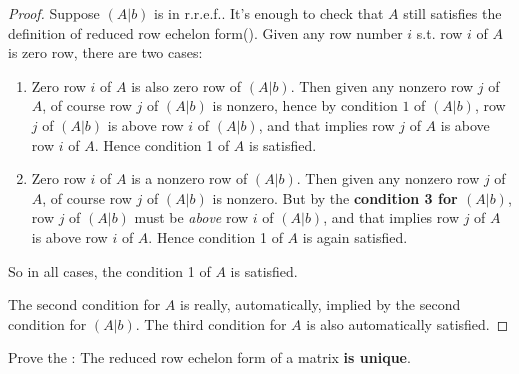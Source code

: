 \begin{proof}
Suppose \((A|b)\) is in r.r.e.f..
It's enough to check that \(A\) still satisfies the definition of reduced row echelon form().
Given any row number \(i\) s.t. row \(i\) of \(A\) is zero row, there are two cases:
\begin{enumerate}
\item Zero row \(i\) of \(A\) is also zero row of \((A|b)\).
    Then given any nonzero row \(j\) of \(A\), of course row \(j\) of \((A|b)\) is nonzero, hence by condition \(1\) of \((A|b)\),
    row \(j\) of \((A|b)\) is above row \(i\) of \((A|b)\), and that implies row \(j\) of \(A\) is above row \(i\) of \(A\).
    Hence condition 1 of \(A\) is satisfied.
\item Zero row \(i\) of \(A\) is a nonzero row of \((A|b)\).
    Then given any nonzero row \(j\) of \(A\), of course row \(j\) of \((A|b)\) is nonzero.
    But by the \textbf{condition 3 for \((A|b)\)}, row \(j\) of \((A|b)\) must be \emph{above} row \(i\) of \((A|b)\), and that implies row \(j\) of \(A\) is above row \(i\) of \(A\).
    Hence condition 1 of \(A\) is again satisfied.
\end{enumerate}
So in all cases, the condition 1 of \(A\) is satisfied.

The second condition for \(A\) is really, automatically, implied by the second condition for \((A|b)\).
The third condition for \(A\) is also automatically satisfied.
\end{proof}

\begin{exercise} \label{exercise 3.4.15}
Prove the :
The reduced row echelon form of a matrix \textbf{is unique}.
\end{exercise}

